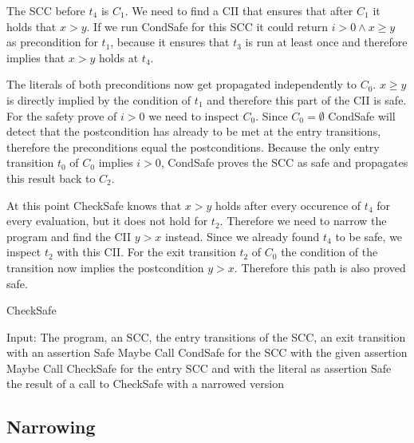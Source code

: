The SCC before $t_4$ is $C_1$.
We need to find a CII that ensures that after $C_1$ it holds that $x > y$.
If we run CondSafe for this SCC it could return $i > 0 \wedge x \geq y$ as precondition for $t_1$, because it ensures that $t_3$ is run at least once and therefore implies that $x > y$ holds at $t_4$.

The literals of both preconditions now get propagated independently to $C_0$.
$x \geq y$ is directly implied by the condition of $t_1$ and therefore this part of the CII is safe.
For the safety prove of $i > 0$ we need to inspect $C_0$.
Since $C_0 = \emptyset$ CondSafe will detect that the postcondition has already to be met at the entry transitions, therefore the preconditions equal the postconditions.
Because the only entry transition $t_0$ of $C_0$ implies $i > 0$, CondSafe proves the SCC as safe and propagates this result back to $C_2$.

At this point CheckSafe knows that $x > y$ holds after every occurence of $t_4$ for every evaluation, but it does not hold for $t_2$.
Therefore we need to narrow the program and find the CII $y > x$ instead.
Since we already found $t_4$ to be safe, we inspect $t_2$ with this CII.
For the exit transition $t_2$ of $C_0$ the condition of the transition now implies the postcondition $y > x$.
Therefore this path is also proved safe.

\begin{algorithm}
\caption{CheckSafe}\label{checksafe}
\begin{algorithmic}[1]
  \State Input: The program, an SCC, the entry transitions of the SCC, an exit transition with an assertion
    \Return Safe
    \Return Maybe
  \EndIf
  \State Call CondSafe for the SCC with the given assertion
    \Return Maybe
  \EndIf
      \State Call CheckSafe for the entry SCC and with the literal as assertion
    \EndFor
  \EndFor
    \Return Safe
  \EndIf
  \Return the result of a call to CheckSafe with a narrowed version
\end{algorithmic}
\end{algorithm}


\subsection{Narrowing}

